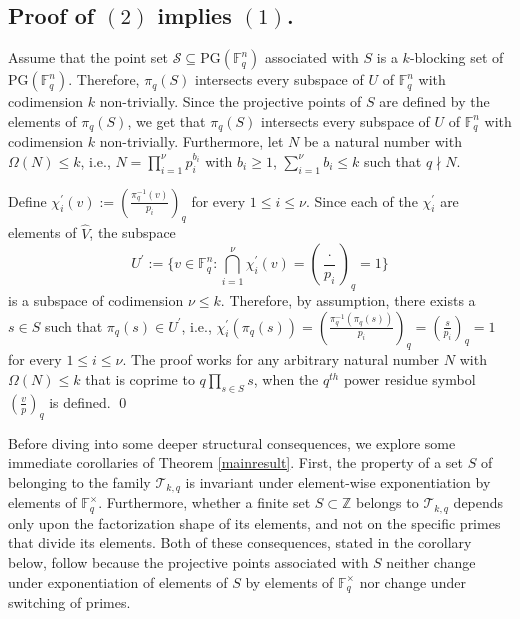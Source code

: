 \documentclass[12pt]{amsart}
\newcommand{\F}{{\mathbb F}}
\newcommand{\PG}{\mathrm{PG}}
\begin{document}
\subsection{Proof of $(2)$ implies $(1)$.}
Assume that the point set  $\mathcal{S} \subseteq \PG(\F_q^n)$ associated with $S$ is a $k$-blocking set of $\PG(\F_q^n)$. Therefore, $\pi_{q}(S)$ intersects every subspace of $U$ of $\mathbb{F}_{q}^{n}$ with codimension $k$ non-trivially. Since the projective points of $S$ are defined by the elements of $\pi_{q}(S)$, we get that $\pi_{q}(S)$ intersects every subspace of $U$ of $\mathbb{F}_{q}^{n}$ with codimension $k$ non-trivially. Furthermore, let $N$ be a natural number with $\Omega(N) \leq k$, i.e., $N = \prod_{i=1}^{\nu} p_{i}^{b_{i}}$ with $b_{i} \geq 1$, $\sum_{i=1}^{\nu} b_{i} \leq k$ such that $q \nmid N$. 

Define $\chi^{\prime}_{i}(v) := \left(\frac{\pi_{q}^{-1}(v)}{p_{i}} \right)_{q}$ for every $1 \leq i \leq \nu$. Since each of the $\chi^{\prime}_{i}$ are elements of $\hat{V}$, the subspace \[ U^{\prime} := \Big\{ v \in\mathbb{F}_{q}^{n} : \bigcap_{i=1}^{\nu} \chi^{\prime}_{i}(v) = \left(\frac{\cdot}{p_{i}} \right)_{q} = 1 \Big\}\] is a subspace of codimension $\nu \leq k$. Therefore, by assumption, there exists a $s \in S$ such that $\pi_{q}(s) \in U^{\prime}$, i.e., $\chi^{\prime}_{i}(\pi_{q}(s)) = \left(\frac{\pi_{q}^{-1}(\pi_{q}(s))}{p_{i}} \right)_{q} = \left(\frac{s}{p_{i}} \right)_{q} = 1$ for every $1 \leq i \leq \nu$. The proof works for any arbitrary natural number $N$ with $\Omega(N) \leq k$ that is coprime to $q \prod_{s\in S} s$, when the $q^{th}$ power residue symbol $\left(\frac{v}{p}\right)_{q}$ is defined. \qed

Before diving into some deeper structural consequences, we explore some immediate corollaries of Theorem \ref{mainresult}. First, the property of a set $S$ of belonging to the family $\mathcal{T}_{k,q}$ is invariant under element-wise exponentiation by elements of $\mathbb{F}_{q}^{\times}$. Furthermore, whether a finite set $S \subset\mathbb{Z}$ belongs to $\mathcal{T}_{k,q}$ depends only upon the factorization shape of its elements, and not on the specific primes that divide its elements. Both of these consequences, stated in the corollary below, follow because the projective points associated with $S$ neither change under exponentiation of elements of $S$ by elements of $\mathbb{F}_{q}^{\times}$ nor change under switching of primes.
\end{document}
